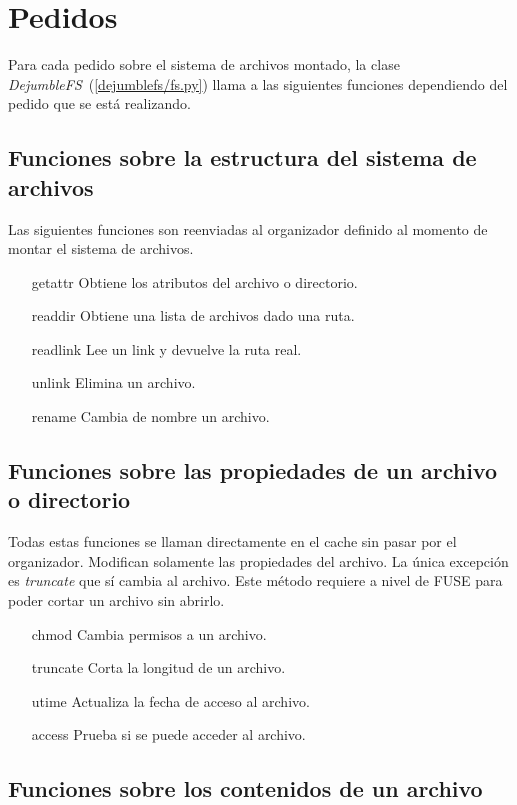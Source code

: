 \section{Pedidos}

Para cada pedido sobre el sistema de archivos montado, la clase \textit{DejumbleFS}~(\ref{dejumblefs/fs.py}) llama a las siguientes funciones dependiendo del pedido que se está realizando.

\subsection{Funciones sobre la estructura del sistema de archivos}

Las siguientes funciones son reenviadas al organizador definido al momento de montar el sistema de archivos.

\begin{itemize}
\item[getattr] Obtiene los atributos del archivo o directorio.
\item[readdir] Obtiene una lista de archivos dado una ruta.
\item[readlink] Lee un link	y devuelve la ruta real.
\item[unlink] Elimina un archivo.
\item[rename] Cambia de nombre un archivo.
\end{itemize}

\subsection{Funciones sobre las propiedades de un archivo o directorio}

Todas estas funciones se llaman directamente en el cache sin pasar por el organizador. Modifican solamente las propiedades del archivo. La única excepción es  \textit{truncate} que sí cambia al archivo. Este método requiere a nivel de FUSE para poder cortar un archivo sin abrirlo.

\begin{itemize}
\item[chmod] Cambia permisos a un archivo.
\item[truncate] Corta la longitud de un archivo.
\item[utime] Actualiza la fecha de acceso al archivo.
\item[access] Prueba si se puede acceder al archivo.
\end{itemize}

\subsection{Funciones  sobre los contenidos de un archivo}

